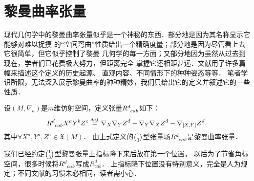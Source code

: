 \section{黎曼曲率张量}\label{chccr:sec_Curvatures}

现代几何学中的黎曼曲率张量似乎是一个神秘的东西．部分地是因为其名称显示它能够对难以捉摸
的“空间弯曲”性质给出一个精确度量；部分地是因为尽管看上去它很简单，但它似乎控制了黎曼
几何学的每一方面；又部分地因为虽然从过去到现在，学者们已花费极大努力，但距离完全
掌握它还相距甚远．文献\parencite[Ch.4]{spivak-dif-2}用了许多篇幅来描述这个定义的历史起源、
直观内容、不同情形下的种种姿态等等．
笔者学识所限，无法深入展示黎曼曲率的种种精妙，我们只给出它的定义并叙述它的一些性质．

\begin{definition}\label{chccr:def_tCurvatures}
    设$(M,\nabla_a)$是$m$维仿射空间，定义张量$R^{d}_{\hphantom{a} cab}$如下：
    \begin{equation}\label{chccr:eqn_RiemannianCurvature-13}
        R_{\hphantom{a} cab}^d{X^a}{Y^b}{Z^c} \overset{def}{=} {\nabla _X}{\nabla _Y}{Z^d} -
        {\nabla _Y}{\nabla _X}{Z^d} - {\nabla _{[X,Y]}}{Z^d}.
    \end{equation}
    其中$\forall X^a, Y^a, Z^a \in \mathfrak{X}(M)$．
    由上式定义的$\binom{1}{3}$型张量场$R^{d}_{\hphantom{a} cab}$是{\heiti 黎曼曲率张量}．
\end{definition}
\begin{remark}
    我们已经约定$\binom{1}{3}$型黎曼张量上指标降下来后放在第一个位置，
    以后为了节省角标空间，很多时候将$R_{\hphantom{a} cab}^d$写成$R_{cab}^d$．
    上指标降下位置没有特别意义，完全是人为规定；不同文献的习惯未必相同，读者需小心．
\end{remark}

